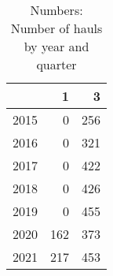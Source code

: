 \begin{table}[ht]
\centering
\begin{tabular}{rrr}
  \hline
 & 1 & 3 \\ 
  \hline
2015 & 0 & 256 \\ 
  2016 & 0 & 321 \\ 
  2017 & 0 & 422 \\ 
  2018 & 0 & 426 \\ 
  2019 & 0 & 455 \\ 
  2020 & 162 & 373 \\ 
  2021 & 217 & 453 \\ 
   \hline
\end{tabular}
\caption{Numbers: Number of hauls by year and quarter} 
\end{table}
